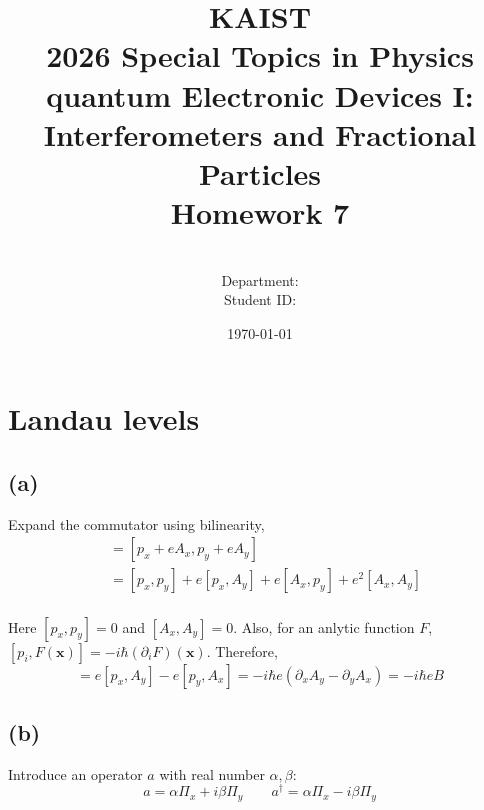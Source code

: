 \documentclass[a4paper,11pt]{article}
\title{KAIST\\2026 Special Topics in Physics quantum Electronic Devices I: Interferometers and Fractional Particles\\
Homework 7\bigskip}
\author{\textbf{\Large \name} \\
Department: \department\\
Student ID: \studentid}
\date{\today}
\begin{document}
\thispagestyle{empty}
\maketitle
\tableofcontents
{}
\setcounter{secnumdepth}{1}
\setcounter{tocdepth}{2}

\newcommand{\tr}{\operatorname{tr}}
\newcommand{\sgn}{\operatorname{sgn}}
\newcommand{\supp}{\operatorname{supp}}
\renewcommand{\Re}{\operatorname{Re}}
\renewcommand{\Im}{\operatorname{Im}}
\newcommand{\boltz}{k_{\mathrm{B}}}

\section{Landau levels}

\subsection{(a)}

Expand the commutator using bilinearity,
\begin{align}
  [\Pi_x, \Pi_y] &= [p_x + e A_x, p_y + e A_y] \\
  &= [p_x, p_y] + e [p_x, A_y] + e [A_x, p_y] + e^2 [A_x, A_y] \\
\end{align}

Here $[p_x, p_y] = 0$ and $[A_x, A_y] = 0$. Also, for an anlytic function $F$, $[p_i, F(\mathbf{x})] = -i\hbar(\partial_i F)(\mathbf{x})$. Therefore,
\begin{equation}
  [\Pi_x, \Pi_y] = e[p_x, A_y] - e[p_y, A_x] = -i\hbar e \left( \partial_x A_y - \partial_y A_x \right) = -i\hbar e B
\end{equation}


\subsection{(b)}

Introduce an operator $a$ with real number $\alpha, \beta$:
\begin{equation}
  a = \alpha\Pi_x + i\beta\Pi_y\qquad a^\dagger = \alpha\Pi_x - i\beta\Pi_y
\end{equation}
\end{document}
